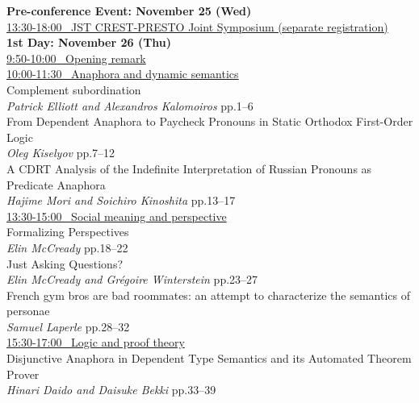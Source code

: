 \documentclass[12pt]{ltjarticle}
\begin{document}
\newcommand{\slot}[2]{\noindent \underline{#1 \  #2} \\}
\newcommand{\talk}[3]{
  \noindent #2 \\ 
  \indent\indent \textit{#1} \dotfill #3 
  \smallskip \\
  }
\newcommand{\talkk}[3]{
  \noindent #2 \\ 
  \indent\indent \textit{#1}
  \smallskip \\
  }


\noindent\textbf{\large 
Pre-conference Event: November 25 (Wed)
}\\



\slot{13:30-18:00}{JST CREST-PRESTO Joint Symposium (separate registration)}




\noindent\textbf{\large 
1st Day: November 26 (Thu)
}\\



\slot{9:50-10:00}{Opening remark}



\slot{10:00-11:30}{Anaphora and dynamic semantics}

  
\talk{Patrick Elliott and Alexandros Kalomoiros}
     {Complement subordination}
     {pp.1--6}
  
\talk{Oleg Kiselyov}
     {From Dependent Anaphora to Paycheck Pronouns in Static Orthodox First-Order Logic}
     {pp.7--12}
  
\talk{Hajime Mori and Soichiro Kinoshita}
     {A CDRT Analysis of the Indefinite Interpretation of Russian Pronouns as Predicate Anaphora}
     {pp.13--17}



\slot{13:30-15:00}{Social meaning and perspective}

  
\talk{Elin McCready}
     {Formalizing Perspectives}
     {pp.18--22}
  
\talk{Elin McCready and Grégoire Winterstein}
     {Just Asking Questions?}
     {pp.23--27}
  
\talk{Samuel Laperle}
     {French gym bros are bad roommates: an attempt to characterize the semantics of personae}
     {pp.28--32}



\slot{15:30-17:00}{Logic and proof theory}

  
\talk{Hinari Daido and Daisuke Bekki}
     {Disjunctive Anaphora in Dependent Type Semantics and its Automated Theorem Prover}
     {pp.33--39}
  
\end{document}
